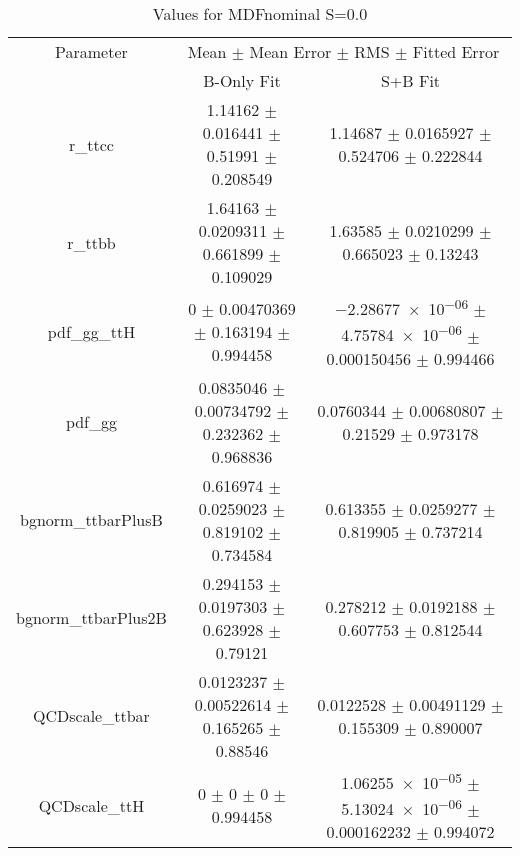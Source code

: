 \begin{table}
\centering
\caption{Values for MDFnominal S=0.0}
\begin{tabular}{ccc}
\toprule
Parameter & \multicolumn{2}{c}{Mean $\pm$ Mean Error $\pm$ RMS $\pm$ Fitted Error}\\
 & B-Only Fit & S+B Fit\\
\midrule
r\_ttcc & \num{1.14162} $\pm$ \num{0.016441} $\pm$ \num{0.51991} $\pm$ \num{0.208549} & \num{1.14687} $\pm$ \num{0.0165927} $\pm$ \num{0.524706} $\pm$ \num{0.222844}\\
r\_ttbb & \num{1.64163} $\pm$ \num{0.0209311} $\pm$ \num{0.661899} $\pm$ \num{0.109029} & \num{1.63585} $\pm$ \num{0.0210299} $\pm$ \num{0.665023} $\pm$ \num{0.13243}\\
pdf\_gg\_ttH & \num{0} $\pm$ \num{0.00470369} $\pm$ \num{0.163194} $\pm$ \num{0.994458} & \num{-2.28677e-06} $\pm$ \num{4.75784e-06} $\pm$ \num{0.000150456} $\pm$ \num{0.994466}\\
pdf\_gg & \num{0.0835046} $\pm$ \num{0.00734792} $\pm$ \num{0.232362} $\pm$ \num{0.968836} & \num{0.0760344} $\pm$ \num{0.00680807} $\pm$ \num{0.21529} $\pm$ \num{0.973178}\\
bgnorm\_ttbarPlusB & \num{0.616974} $\pm$ \num{0.0259023} $\pm$ \num{0.819102} $\pm$ \num{0.734584} & \num{0.613355} $\pm$ \num{0.0259277} $\pm$ \num{0.819905} $\pm$ \num{0.737214}\\
bgnorm\_ttbarPlus2B & \num{0.294153} $\pm$ \num{0.0197303} $\pm$ \num{0.623928} $\pm$ \num{0.79121} & \num{0.278212} $\pm$ \num{0.0192188} $\pm$ \num{0.607753} $\pm$ \num{0.812544}\\
QCDscale\_ttbar & \num{0.0123237} $\pm$ \num{0.00522614} $\pm$ \num{0.165265} $\pm$ \num{0.88546} & \num{0.0122528} $\pm$ \num{0.00491129} $\pm$ \num{0.155309} $\pm$ \num{0.890007}\\
QCDscale\_ttH & \num{0} $\pm$ \num{0} $\pm$ \num{0} $\pm$ \num{0.994458} & \num{1.06255e-05} $\pm$ \num{5.13024e-06} $\pm$ \num{0.000162232} $\pm$ \num{0.994072}\\
\bottomrule
\end{tabular}
\end{table}